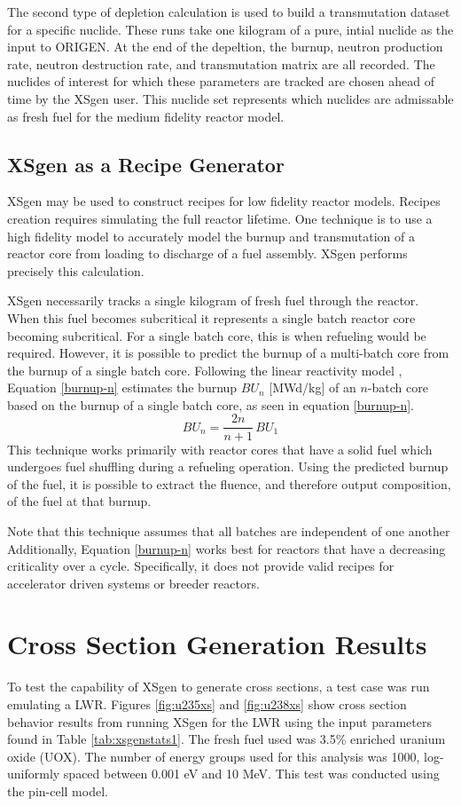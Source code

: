 \documentclass{article}
\begin{document}
The second type of depletion calculation is used to build a transmutation dataset for a
specific nuclide. These runs take one kilogram of a pure, intial nuclide as the input to
ORIGEN. At the end of the depeltion, the burnup, neutron production rate, neutron
destruction rate, and transmutation matrix are all recorded. The nuclides of interest
for which these parameters are tracked are chosen ahead of time by the XSgen user.
This nuclide set represents which nuclides are admissable as fresh fuel for the medium
fidelity reactor model.

\subsection{XSgen as a Recipe Generator}
\label{sec:recipe}
XSgen may be used to construct recipes for low fidelity reactor models. Recipes creation
requires simulating the full reactor lifetime. One technique is to use a high fidelity
model to accurately model the burnup and transmutation of a reactor core from loading to
discharge of a fuel assembly. XSgen performs precisely this calculation.

XSgen necessarily tracks a single kilogram of fresh fuel through the reactor. When this
fuel becomes subcritical it represents a single batch reactor core becoming subcritical.
For a single batch core, this is when refueling would be required. However, it is possible
to predict the burnup of a multi-batch core from the burnup of a single batch core.
Following the linear reactivity model \cite{linear}, Equation \ref{burnup-n} estimates the burnup
$BU_n$ [MWd/kg] of an $n$-batch core based on the burnup of a single batch core, as seen in equation \ref{burnup-n}.
\begin{equation}
\label{burnup-n}
BU_n = \frac{2n}{n+1} \, BU_1
\end{equation}
This technique works primarily with reactor cores that have a solid fuel which undergoes
fuel shuffling during a refueling operation. Using the predicted burnup of the fuel,
it is possible to extract the fluence, and therefore output composition,
of the fuel at that burnup\cite{brightlite, linear}. 

Note that this technique assumes that all batches are independent of one another
Additionally, Equation \ref{burnup-n} works best for reactors that have a decreasing
criticality over a cycle. Specifically, it does not provide valid recipes for accelerator
driven systems or breeder reactors.

\section{Cross Section Generation Results}
\label{sec:crosssection}
To test the capability of XSgen to generate cross sections, a test case was run emulating a LWR. 
Figures \ref{fig:u235xs} and \ref{fig:u238xs} show cross section behavior results
from running XSgen for the LWR using the input parameters found in
Table \ref{tab:xsgenstats1}. The fresh fuel used was 3.5\% enriched uranium oxide (UOX).
The number of energy groups used for this analysis was 1000, log-uniformly spaced between
0.001 eV and 10 MeV. This test was conducted using the pin-cell model\cite{pin-cell}. 
\end{document}
